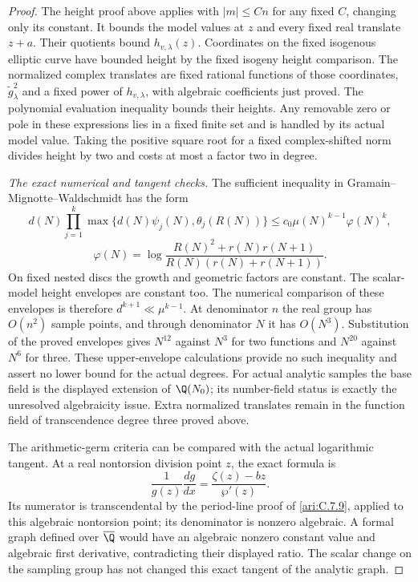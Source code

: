 \begin{proof}
The height proof above applies with $|m|\le Cn$ for any fixed
$C$, changing only its constant. It bounds the model values at
$z$ and every fixed real translate $z+a$. Their quotients bound
$h_{v,\lambda}(z)$. Coordinates on the fixed isogenous elliptic
curve have bounded height by the fixed isogeny height comparison.
The normalized complex translates are fixed rational functions
of those coordinates, $\widetilde g_\lambda^2$ and a fixed power
of $h_{v,\lambda}$, with algebraic coefficients just proved.
The polynomial evaluation inequality bounds their heights.
Any removable zero or pole in these expressions lies in a fixed
finite set and is handled by its actual model value. Taking the
positive square root for a fixed complex-shifted norm divides
height by two and costs at most a factor two in degree.


\emph{The exact numerical and tangent checks.}
The sufficient inequality in Gramain--Mignotte--Waldschmidt
\citep[Theorem2.1,pp.101--102]{gramain1986values} has the form
\[
 d(N)\prod_{j=1}^k\max\{d(N)\psi_j(N),\theta_j(R(N))\}
 \le c_0\mu(N)^{k-1}\varphi(N)^k,
\]
\[
 \varphi(N)=\log\frac{R(N)^2+r(N)r(N+1)}
                         {R(N)(r(N)+r(N+1))}.
\]
On fixed nested discs the growth and geometric factors are
constant. The scalar-model height envelopes are constant too.
The numerical comparison of these envelopes is therefore
$d^{k+1}\ll\mu^{k-1}$. At denominator $n$ the real group
has $O(n^2)$ sample points, and through denominator $N$ it
has $O(N^3)$. Substitution of the proved envelopes gives
$N^{12}$ against $N^3$ for two functions and $N^{20}$ against
$N^6$ for three. These upper-envelope calculations provide
no such inequality and assert no lower bound for the actual
degrees. For actual analytic samples the base field is the
displayed extension of $\Q(N_0)$; its number-field status is
exactly the unresolved algebraicity issue. Extra normalized
translates remain in the function field of transcendence degree
three proved above.

The arithmetic-germ criteria
\citep[Theorem6.1]{herblot2012meromorphic}
\citep[Theorem4.16]{gasbarri2010analytic}
can be compared with the actual logarithmic tangent. At a real
nontorsion division point $z$, the exact formula is
\[
 \frac1{g(z)}\frac{dg}{dx}
       =\frac{\zeta(z)-bz}{\wp'(z)}.
\]
Its numerator is transcendental by the period-line proof of
\ref{ari:C.7.9}, applied to this algebraic nontorsion point;
its denominator is nonzero algebraic. A formal graph defined
over $\overline\Q$ would have an algebraic nonzero constant
value and algebraic first derivative, contradicting their
displayed ratio. The scalar change on the sampling group has
not changed this exact tangent of the analytic graph.


\end{proof}
